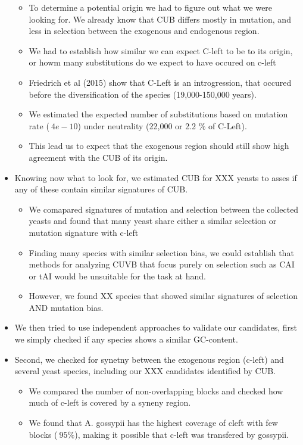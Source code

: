 \documentclass[12pt]{article}
\begin{document}
\begin{itemize}
	\begin{itemize}
		\item To determine a potential origin we had to figure out what we were looking for. We already know that CUB differs mostly in mutation, and less in selection between the exogenous and endogenous region.
		\item We had to establish how similar we can expect C-left to be to its origin, or howm many substitutions do we expect to have occured on c-left
		\item Friedrich et al  (2015) show that C-Left is an introgression, that occured before the diversification of the species (19,000-150,000 years). 
		\item We estimated the expected number of substitutions based on mutation rate ($~4e-10$) under neutrality (22,000 or 2.2 \% of C-Left).
		\item This lead us to expect that the exogenous region should still show high agreement with the CUB of its origin.
	\end{itemize}
	\item Knowing now what to look for, we estimated CUB for XXX yeasts to asses if any of these contain similar signatures of CUB.
	\begin{itemize}
		\item We comapared signatures of mutation and selection between the collected yeasts and found that many yeast share either a similar selection or mutation signature with c-left	
		\item Finding many species with similar selection bias, we could establish that methods for analyzing CUVB that focus purely on selection such as CAI or tAI would be unsuitable for the task at hand.
		\item However, we found XX species that showed similar signatures of selection AND mutation bias. 
	\end{itemize}
	\item We then tried to use independent approaches to validate our candidates, first we simply checked if any species shows a similar GC-content.
	\item Second, we checked for synetny between the exogenous region (c-left) and several yeast species, including our XXX candidates identified by CUB.
	\begin{itemize}
		\item We compared the number of non-overlapping blocks and checked how much of c-left is covered by a syneny region.
		\item We found that A. gossypii has the highest coverage of cleft with few blocks ($~95\%$), making it possible that c-left was transfered by gossypii.

\end{itemize}
\end{itemize}
\end{document}
